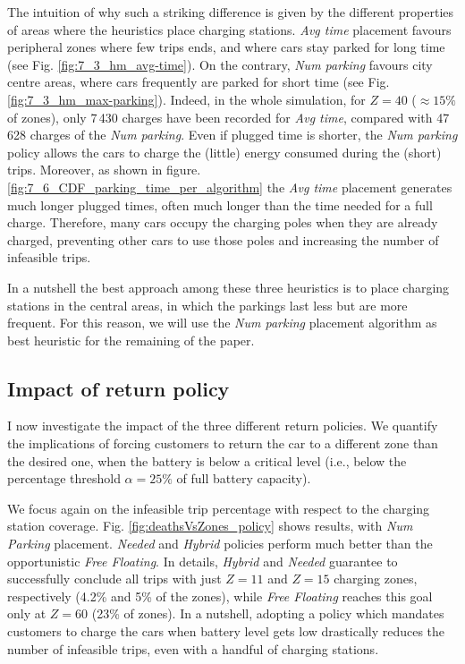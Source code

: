 The intuition of why such a striking difference is given by the different properties of areas where the heuristics place charging stations. \textit{Avg time} placement favours peripheral zones where few trips ends, and where cars stay parked for long time (see Fig. \ref{fig:7_3_hm_avg-time}). On the contrary, \textit{Num parking} favours city centre areas, where cars frequently are parked for short time (see Fig. \ref{fig:7_3_hm_max-parking}). Indeed, in the whole simulation, for $Z=40$ ($\approx 15\%$ of zones), only 7\,430 charges have been recorded for \textit{Avg time}, compared with 47\,628 charges of the \textit{Num parking}.
Even if plugged time is shorter, the \textit{Num parking} policy allows the cars to charge the (little) energy consumed during the (short) trips.
Moreover, as shown in figure. \ref{fig:7_6_CDF_parking_time_per_algorithm} the \textit{Avg time} placement generates much longer plugged times, often much longer than the time needed for a full charge. Therefore, many cars occupy the charging poles when they are already charged, preventing other cars to use those poles and increasing the number of infeasible trips. 

In a nutshell the best approach among these three heuristics is to place charging stations in the central areas, in which the parkings last less but are more frequent. For this reason, we will use the \textit{Num parking} placement algorithm as best heuristic for the remaining of the paper.



\subsection{Impact of return policy}

I now investigate the impact of the three different return policies. We quantify the implications of forcing customers to return the car to a different zone than the desired one, when the battery is below a critical level (i.e., below the percentage threshold $\alpha=25\%$ of full battery capacity).

We focus again on the infeasible trip percentage with respect to the charging station coverage.
Fig. \ref{fig:deathsVsZones_policy} shows results, with \textit{Num Parking} placement. \textit{Needed} and \textit{Hybrid} policies perform much better than the opportunistic \textit{Free Floating}.
In details, \textit{Hybrid} and \textit{Needed} guarantee to successfully conclude all trips with just $Z=11$ and $Z=15$ charging zones, respectively (4.2\% and 5\% of the zones), while \textit{Free Floating} reaches this goal only at $Z=60$  (23\% of zones).
In a nutshell, adopting a policy which mandates customers to charge the cars when battery level gets low drastically reduces the number of infeasible trips, even with a handful of  charging stations.

